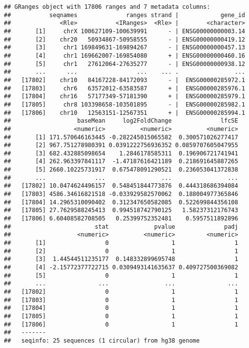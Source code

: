 \documentclass[
  9pt,
  a4paper,
]{extarticle}
\begin{document}
\begin{verbatim}
## GRanges object with 17806 ranges and 7 metadata columns:
##           seqnames              ranges strand |            gene_id
##              <Rle>           <IRanges>  <Rle> |        <character>
##       [1]     chrX 100627109-100639991      - | ENSG00000000003.14
##       [2]    chr20   50934867-50958555      - | ENSG00000000419.12
##       [3]     chr1 169849631-169894267      - | ENSG00000000457.13
##       [4]     chr1 169662007-169854080      + | ENSG00000000460.16
##       [5]     chr1   27612064-27635277      - | ENSG00000000938.12
##       ...      ...                 ...    ... .                ...
##   [17802]    chr10   84167228-84172093      - |  ENSG00000285972.1
##   [17803]     chr6   63572012-63583587      + |  ENSG00000285976.1
##   [17804]    chr16   57177349-57181390      + |  ENSG00000285979.1
##   [17805]     chr8 103398658-103501895      - |  ENSG00000285982.1
##   [17806]    chr10   12563151-12567351      + |  ENSG00000285994.1
##                   baseMean     log2FoldChange              lfcSE
##                  <numeric>          <numeric>          <numeric>
##       [1] 171.570646163445 -0.282245015065582  0.300571026277417
##       [2] 967.751278980391 0.0391222756936352 0.0859707605047955
##       [3] 682.432885098654    1.2846178585311  0.196906721741941
##       [4] 262.963397841117  -1.47187616421189  0.218691645887265
##       [5] 2660.10225731917  0.675478091290521  0.236053041372838
##       ...              ...                ...                ...
##   [17802] 10.0474624496157  0.548451844773876  0.444318686394084
##   [17803] 4586.34616821518 -0.033929582570062  0.188004977365846
##   [17804] 14.2965310090402  0.312347650582085  0.522699844356108
##   [17805] 27.7629588245413  0.994518742790125   1.58237312176743
##   [17806] 6.60408582708505   0.25399752352481    0.5957511892896
##                        stat             pvalue              padj
##                   <numeric>          <numeric>         <numeric>
##       [1]                 0                  1                 1
##       [2]                 0                  1                 1
##       [3]  1.44544511235177  0.148332899695748                 1
##       [4] -2.15772377722715 0.0309493141635637 0.409727500369082
##       [5]                 0                  1                 1
##       ...               ...                ...               ...
##   [17802]                 0                  1                 1
##   [17803]                 0                  1                 1
##   [17804]                 0                  1                 1
##   [17805]                 0                  1                 1
##   [17806]                 0                  1                 1
##   -------
##   seqinfo: 25 sequences (1 circular) from hg38 genome
\end{verbatim}
\end{document}
